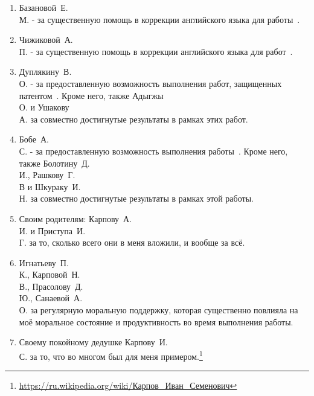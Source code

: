 \begin{enumerate}
\item Базановой~Е.\\М. - за существенную помощь в коррекции английского языка для работы~\cite{enmtl}.
\item Чижиковой~А.\\П. - за существенную помощь в коррекции английского языка для работ~\cite{rumtl,rutopics}.
\item Дуплякину~В.\\О. - за предоставленную возможность выполнения работ, защищенных патентом~\cite{Дуплякин_Дмитрий_Ондар_Ушаков_2021}. Кроме него, также Адыгжы~\\О. и Ушакову~\\А. за совместно достигнутые результаты в рамках этих работ. 
\item Бобе~А.\\С. - за предоставленную возможность выполнения работы~\cite{Болотин_Карпов_Рашков_Шкурак_2019}. Кроме него, также Болотину~Д.\\И., Рашкову~Г.\\В и Шкураку~И.\\Н. за совместно достигнутые результаты в рамках этой работы. 
\item Своим родителям: Карпову~А.\\И. и Приступа~И.\\Г. за то, сколько всего они в меня вложили, и вообще за всё.
\item Игнатьеву~П.\\К., Карповой~Н.\\В., Прасолову~Д.\\Ю., Санаевой~А.\\О. за регулярную моральную поддержку, которая существенно повлияла на моё моральное состояние и продуктивность во время выполнения работы. 
\item Своему покойному дедушке Карпову~И.\\С. за то, что во многом был для меня примером.\footnote{\url{https://ru.wikipedia.org/wiki/Карпов\_Иван\_Семенович}}
\end{enumerate}



